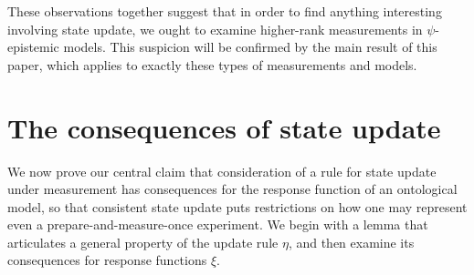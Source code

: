 \documentclass[%
 reprint,
superscriptaddress,
nofootinbib,
 amsmath,amssymb,
 prx, 
 accepted=2019-09-27,
]{quantumarticle}
\begin{document}
These observations together suggest that in order to find anything
interesting involving state update, we ought to examine higher-rank
measurements in $\psi$-epistemic models. This suspicion will be
confirmed by the main result of this paper, which applies to exactly
these types of measurements and models.

\section{The consequences of state update}

\label{sec:main-thm}
We now prove our central claim that consideration of a rule for state
update under measurement has consequences for the response function of
an ontological model, so that consistent state update puts
restrictions on how one may represent even a prepare-and-measure-once
experiment. We begin with a lemma that articulates a general property
of the update rule $\eta$, and then examine its consequences for
response functions $\xi$.
\end{document}
